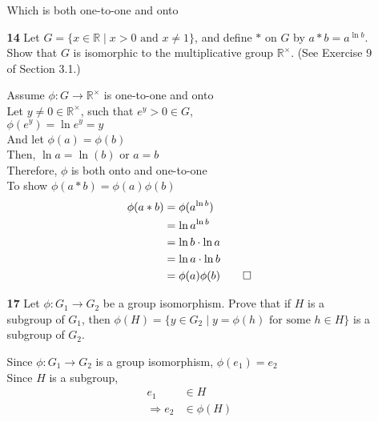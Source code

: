 \documentclass[paper=usletter, fontsize=12pt]{article}
\begin{document}
\begin{itemize}
\begin{itemize}
\begin{cproof}
                Which is both one-to-one and onto \qedhere

            \end{cproof}

            \item[\textbf{14}] Let $G=\{x \in \mathbb{R} \mid x > 0 \text{ and
            } x \neq 1\}$, and define $*$ on $G$ by $a * b = a^{\ln{b}}$. Show
            that $G$ is isomorphic to the multiplicative group
            $\mathbb{R}^{\times}$. (See Exercise 9 of Section 3.1.)
            \begin{cproof}

                Assume $\phi: G \rightarrow \mathbb{R}^{\times}$ is one-to-one
                and onto\\
                Let $y \neq 0 \in \mathbb{R}^{\times}$, such that $e^y>0 \in G$,\\
                $\phi(e^y) = \ln{e^y} = y$\\

                And let $\phi(a)=\phi(b)$\\
                Then, $\ln{a}=\ln(b)$ or $a=b$\\
                Therefore, $\phi$ is both onto and one-to-one\\

                To show $\phi(a*b)=\phi(a)\phi(b)$
                \begin{align*}
                    \phi(a*b) &= \phi(a^{\ln{b}})\\
                    & = \ln{a^{\ln{b}}}\\
                    & = \ln{b}\cdot\ln{a}\\
                    & = \ln{a}\cdot\ln{b}\\
                    & = \phi(a)\phi(b) \qedhere
                \end{align*}

            \end{cproof}

            \item[\textbf{17}] Let $\phi: G_1 \rightarrow G_2$ be a group
            isomorphism. Prove that if $H$ is a subgroup of $G_1$, then
            $\phi(H)=\{y\in G_2 \mid y = \phi(h) \text{ for some } h \in H\}$
            is a subgroup of $G_2$.
            \begin{cproof}

                Since $\phi:G_1 \rightarrow G_2$ is a group isomorphism,
                $\phi(e_1)=e_2$\\
                Since $H$ is a subgroup,
                \begin{align*}
                    e_1 & \in H\\
                    \Rightarrow e_2 & \in \phi(H)
                \end{align*}


\end{cproof}
\end{itemize}
\end{itemize}
\end{document}
